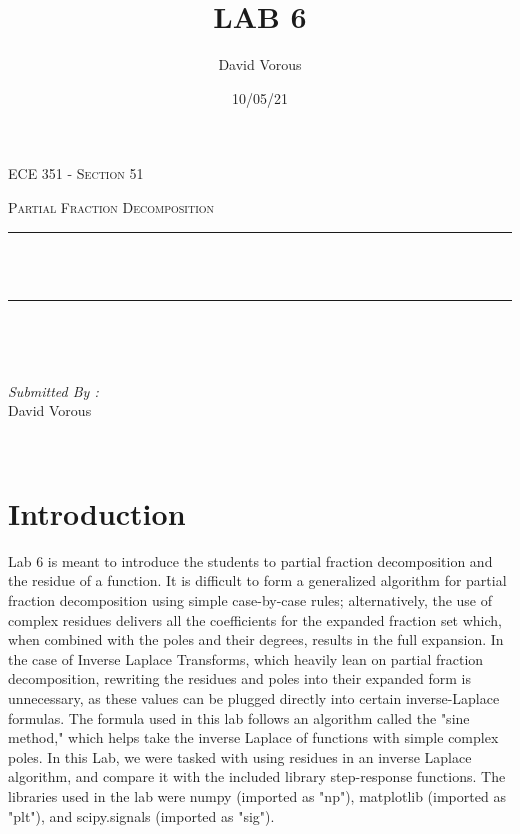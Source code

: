 \documentclass[12pt]{report}
\title{LAB 6}
\author{ David Vorous}
\date{10/05/21}
\makeatletter
\let\thetitle\@title
\makeatother
\begin{document}
\begin{titlepage}
	\centering
    \vspace*{0.5 cm}
\begin{center}    \textsc{\Large   ECE 351 - Section 51 }\\[2.0 cm]	\end{center}
	\textsc{\Large Partial Fraction Decomposition  }\\[0.5 cm]
	\rule{\linewidth}{0.2 mm} \\[0.4 cm]
	{ \huge \bfseries \thetitle}\\
	\rule{\linewidth}{0.2 mm} \\[1.5 cm]
	
	\begin{minipage}{0.4\textwidth}
		\begin{flushleft} \large
			\end{flushleft}
			\end{minipage}~
			\begin{minipage}{0.4\textwidth}
            
			\begin{flushright} \large
			\emph{Submitted By :} \\
			David Vorous  
		\end{flushright}
           
	\end{minipage}\\[2 cm]

\end{titlepage}


\tableofcontents

\pagebreak

\renewcommand{\thesection}{\arabic{section}}

\section{Introduction}

Lab 6 is meant to introduce the students to partial fraction decomposition and the residue of a function. It is difficult to form a generalized algorithm for partial fraction decomposition using simple case-by-case rules; alternatively, the use of complex residues delivers all the coefficients for the expanded fraction set which, when combined with the poles and their degrees, results in the full expansion. In the case of Inverse Laplace Transforms, which heavily lean on partial fraction decomposition, rewriting the residues and poles into their expanded form is unnecessary, as these values can be plugged directly into certain inverse-Laplace formulas. The formula used in this lab follows an algorithm called the "sine method," which helps take the inverse Laplace of functions with simple complex poles. In this Lab, we were tasked with using residues in an inverse Laplace algorithm, and compare it with the included library step-response functions. The libraries used in the lab were numpy (imported as "np"), matplotlib (imported as "plt"), and scipy.signals (imported as "sig").
\end{document}
